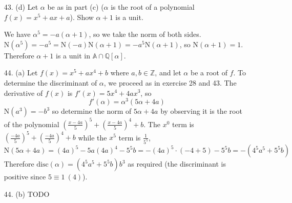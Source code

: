 \documentclass{article}
\newcommand{\Q}[0]{\mathbb{Q}}
\newcommand{\Z}[0]{\mathbb{Z}}
\newcommand{\norm}[1]{\text{N}(#1)}
\newcommand{\disc}[1]{\text{disc}(#1)}
\begin{document}
\begin{enumerate}
\begin{verbatim}
[(3 * 13 * 67, True),
    (2357, True),
    (7 * 227, True),
    (31 * 43, True),
    (5 * 113, True),
    (3 * 103, True),
    (-1 * 7 * 29, True),
    (-1 * 5 * 11 * 13, True)]
    \end{verbatim}

    Experimenting a bit more with Sage, we can quickly test integers using the following code:
    \begin{verbatim}
sage: def test_poly_degree_5(a):
....:     return (is_squarefree(5^5 + 4^4 *a) and
....:             is_squarefree(a))
....:
sage: filter(lambda x: test_poly_degree_5(x),
....:        range(2, 30))
[2, 3, 5, 6, 7, 10, 11, 14, 15, 17, 19, 21, 23, 26, 29]
sage: filter(lambda x: test_poly_degree_5(x),
....:        range(-2, -30, -1))
[-2, -3, -6, -7, -10, -11, -13, -15, -17, -19, -21,
 -22, -26, -29]
\end{verbatim}

\item[43. (d)] Let $\alpha$ be as in part (c) ($\alpha$ is the root of a polynomial $f(x) = x^5 + ax + a$).  Show $\alpha + 1$ is a unit.

We have $\alpha^5 = -a(\alpha + 1)$, so we take the norm of both sides.  $\norm{\alpha^5} = -a^5 = \norm{-a} \norm{\alpha + 1} = -a^5 \norm{\alpha+1}$, so $\norm{\alpha + 1} = 1$.  Therefore $\alpha + 1$ is a unit in $\mathbb{A} \cap \Q[\alpha]$.

\item[44. (a)] Let $f(x) = x^5 + ax^4 + b$ where $a, b \in \Z$, and let $\alpha$ be a root of $f$.  To determine the discriminant of $\alpha$, we proceed as in exercise 28 and 43.  The derivative of $f(x)$ is $f'(x) = 5x^4 + 4ax^3$, so  \[ f'(\alpha) = \alpha^3(5\alpha + 4a) \]  $\norm{a^3} = -b^3$ so determine the norm of $5\alpha + 4a$ by observing it is the root of the polynomial $(\frac{x - 4a}{5})^5 + (\frac{x - 4a}{5})^4 + b$.  The $x^0$ term is $(\frac{-4a}{5})^5 + (\frac{-4a}{5})^4 + b$ while the $x^5$ term is $\frac{1}{5^5}$, \[ \norm{5\alpha + 4a} = (4a)^5 - 5a (4a)^4 - 5^5 b = -(4a)^5 \cdot (-4 + 5) - 5^5 b = -(4^5 a^5 + 5^5 b) \]  Therefore $\disc{\alpha} = (4^5 a^5 + 5^5 b)b^3$ as required (the discriminant is positive since $5 \equiv 1\ (4)$).

\item[44. (b)] TODO

\end{enumerate}
\end{document}
